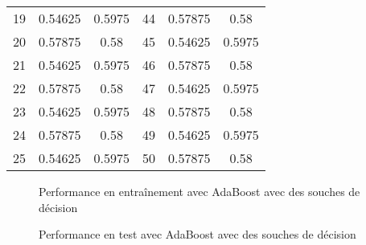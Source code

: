 \documentclass[french, twoside=semi, headings=normal]{scrartcl}
\begin{document}
\begin{table}
\begin{tabular}{S S S S S S}
			19 & 0.54625 & 0.5975 & 44 & 0.57875 & 0.58 \\
			20 & 0.57875 & 0.58 & 45 & 0.54625 & 0.5975 \\
			21 & 0.54625 & 0.5975 & 46 & 0.57875 & 0.58 \\
			22 & 0.57875 & 0.58 & 47 & 0.54625 & 0.5975 \\
			23 & 0.54625 & 0.5975 & 48 & 0.57875 & 0.58 \\
			24 & 0.57875 & 0.58 & 49 & 0.54625 & 0.5975 \\
			25 & 0.54625 & 0.5975 & 50 & 0.57875 & 0.58 \\
		\bottomrule
	\end{tabular}
	\label{tab:adaboost_scores_with_decision_stumps}
\end{table}
\begin{figure}
	\centering
	
	\caption{Performance en entraînement avec AdaBoost avec des souches de décision}
	\label{fig:adaboost_train_scores_with_decision_stumps}
\end{figure}
\begin{figure}
	\centering
	
	\caption{Performance en test avec AdaBoost avec des souches de décision}
	\label{fig:adaboost_test_scores_with_decision_stumps}
\end{figure}
\end{document}
